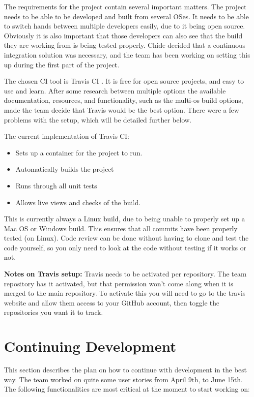 \documentclass[10pt]{extarticle} %
\begin{document}
    The requirements for the project contain several important matters.
    The project needs to be able to be developed and built from several OSes.
    It needs to be able to switch hands between multiple developers easily, due to it being open source.
    Obviously it is also important that those developers can also see that the build they are working from is being tested properly.
    Chide decided that a continuous integration solution was necessary, and the team has been working on setting this up during the first part of the project.

    The chosen CI tool is Travis CI .
    It is free for open source projects, and easy to use and learn.
    After some research between multiple options the available documentation, resources, and functionality, such as the multi-os build options, made the team decide that Travis would be the best option.
    There were a few problems with the setup, which will be detailed further below.

    The current implementation of Travis CI:
    \begin{itemize}
        \item Sets up a container for the project to run.
        \item Automatically builds the project
        \item Runs through all unit tests
        \item Allows live views and checks of the build.
    \end{itemize}
    This is currently always a Linux build, due to being unable to properly set up a Mac OS or Windows build.
    This ensures that all commits have been properly tested (on Linux).
    Code review can be done without having to clone and test the code yourself, so you only need to look at the code without testing if it works or not.

    \textbf{Notes on Travis setup:}
    Travis needs to be activated per repository.
    The team repository has it activated, but that permission won't come along when it is merged to the main repository.
    To activate this you will need to go to the travis website and allow them access to your GitHub account, then toggle the repositories you want it to track.
    \newpage

    \section{Continuing Development}
    This section describes the plan on how to continue with development in the best way.
    The team worked on quite some user stories from April 9th, to June 15th.
    The following functionalities are most critical at the moment to start working on:
\end{document}
